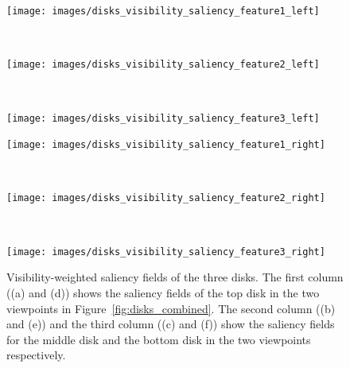 \begin{figure}
	\centering
	\begin{minipage}{.3\textwidth}
		\texttt{[image: images/disks\_visibility\_saliency\_feature1\_left]}
		\subcaption{}
	\end{minipage}~
	\begin{minipage}{.3\textwidth}
		\texttt{[image: images/disks\_visibility\_saliency\_feature2\_left]}
		\subcaption{}
	\end{minipage}~
	\begin{minipage}{.3\textwidth}
		\texttt{[image: images/disks\_visibility\_saliency\_feature3\_left]}
		\subcaption{}
	\end{minipage}
	\begin{minipage}{.3\textwidth}
		\texttt{[image: images/disks\_visibility\_saliency\_feature1\_right]}
		\subcaption{}
	\end{minipage}~
	\begin{minipage}{.3\textwidth}
		\texttt{[image: images/disks\_visibility\_saliency\_feature2\_right]}
		\subcaption{}
	\end{minipage}~
	\begin{minipage}{.3\textwidth}
		\texttt{[image: images/disks\_visibility\_saliency\_feature3\_right]}
		\subcaption{}
	\end{minipage}
	\caption[Visibility-weighted saliency fields of the three disks.]{Visibility-weighted saliency fields of the three disks. The first column ((a) and (d)) shows the saliency fields of the top disk in the two viewpoints in Figure~\ref{fig:disks_combined}. The second column ((b) and (e)) and the third column ((c) and (f)) show the saliency fields for the middle disk and the bottom disk in the two viewpoints respectively.}
	\label{fig:disks_visibility_saliency_fields}
\end{figure}

